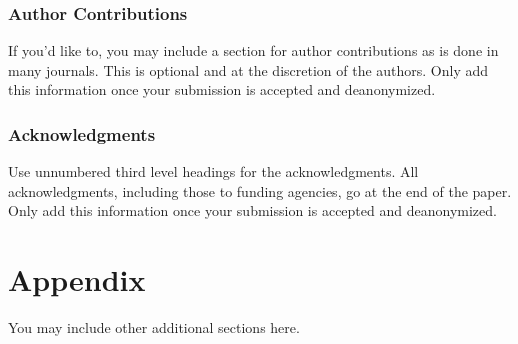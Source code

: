 \documentclass[10pt]{article} %
\begin{document}
\subsubsection*{Author Contributions}
If you'd like to, you may include a section for author contributions as is done
in many journals. This is optional and at the discretion of the authors. Only add
this information once your submission is accepted and deanonymized.

\subsubsection*{Acknowledgments}
Use unnumbered third level headings for the acknowledgments. All
acknowledgments, including those to funding agencies, go at the end of the paper.
Only add this information once your submission is accepted and deanonymized.




\appendix
\section{Appendix}
You may include other additional sections here.
\end{document}
